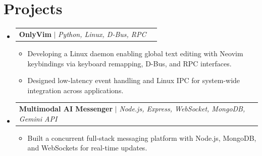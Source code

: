 \documentclass[letterpaper,11pt]{article}
\makeatletter
\newcommand{\resumeItem}[1]{
  \item\small{
    {#1 \vspace{-2pt}}
  }
}
\newcommand{\resumeProjectHeading}[2]{
    \item
    \begin{tabular*}{0.97\textwidth}{l@{\extracolsep{\fill}}r}
      \small#1 & #2 \\
    \end{tabular*}\vspace{-7pt}
}
\newcommand{\resumeSubHeadingListStart}{\begin{itemize}[leftmargin=0.15in, label={}]}
\newcommand{\resumeSubHeadingListEnd}{\end{itemize}}
\newcommand{\resumeItemListStart}{\begin{itemize}[leftmargin=0.2in]}
\newcommand{\resumeItemListEnd}{\end{itemize}\vspace{-5pt}}
\makeatother
\begin{document}
\section{Projects}
\resumeSubHeadingListStart

    \resumeProjectHeading
      {\textbf{OnlyVim} $|$ \emph{Python, Linux, D-Bus, RPC}}{}
      \resumeItemListStart
        \resumeItem{Developing a Linux daemon enabling global text editing with Neovim keybindings via keyboard remapping, D-Bus, and RPC interfaces.}
        \resumeItem{Designed low-latency event handling and Linux IPC for system-wide integration across applications.}
      \resumeItemListEnd

    \resumeProjectHeading
      {\textbf{Multimodal AI Messenger} $|$ \emph{Node.js, Express, WebSocket, MongoDB, Gemini API}}{}
      \resumeItemListStart
        \resumeItem{Built a concurrent full-stack messaging platform with Node.js, MongoDB, and WebSockets for real-time updates.}
      \resumeItemListEnd

\resumeSubHeadingListEnd
\end{document}
